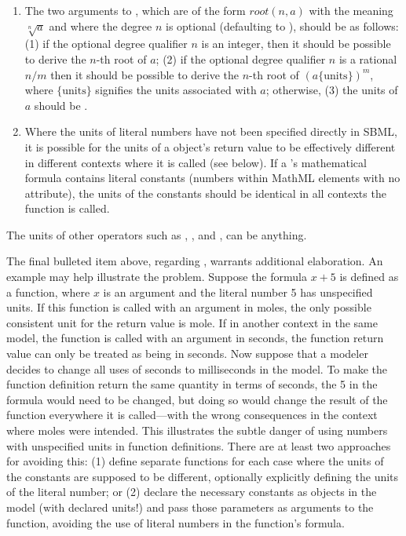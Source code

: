 \begin{enumerate}
\item The two arguments to , which are of the form
  $\textit{root}(n,a)$ with the meaning $\sqrt[n]{a}$ and where
  the degree $n$ is optional (defaulting to ), should be as
  follows: (1) if the optional degree qualifier $n$ is an integer,
  then it should be possible to derive the $n$-th root of $a$; (2)
  if the optional degree qualifier $n$ is a rational $n/m$ then it
  should be possible to derive the $n$-th root of $(a
  \{\text{units}\})^m$, where $\{\text{units}\}$ signifies the
  units associated with $a$; otherwise, (3) the units of $a$ should
  be .

\item Where the units of literal numbers have not been specified
  directly in SBML, it is possible for the units of a
  \FunctionDefinition object's return value to be effectively
  different in different contexts where it is called (see below).  If a
  \FunctionDefinition's mathematical formula contains literal
  constants (\ie numbers within MathML  elements with no
   attribute), the
  units of the constants should be identical in all contexts the
  function is called.

\end{enumerate}

The units of other operators such as , ,
and , can be anything.

The final bulleted item above, regarding \FunctionDefinition,
warrants additional elaboration.  An example may help illustrate
the problem.  Suppose the formula $x + 5$ is defined as a
function, where $x$ is an argument and the literal number 5
has unspecified units.  If this function is called with an
argument in moles, the only possible consistent unit for the
return value is mole.  If in another context in the same model,
the function is called with an argument in seconds, the function
return value can only be treated as being in seconds.  Now suppose
that a modeler decides to change all uses of seconds to
milliseconds in the model.  To make the function definition return
the same quantity in terms of seconds, the 5 in the formula would
need to be changed, but doing so would change the result of the
function everywhere it is called---with the wrong consequences in
the context where moles were intended.  This illustrates the
subtle danger of using numbers with unspecified units in function
definitions.  There are at least two approaches for avoiding this:
(1) define separate functions for each case where the units of the
constants are supposed to be different, optionally explicitly
defining the units of the literal number; or (2) declare the
necessary constants as \Parameter objects in the model (with
declared units!) and pass those parameters as arguments to the
function, avoiding the use of literal numbers in the function's
formula.



